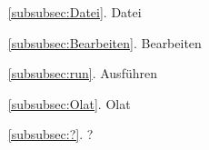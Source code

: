 \documentclass[11pt]{article}
\begin{document}
\begin{itemize}
	\item[\ref{subsubsec:Datei}.] Datei
	\item[\ref{subsubsec:Bearbeiten}.] Bearbeiten
	\item[\ref{subsubsec:run}.] Ausführen
	\item[\ref{subsubsec:Olat}.] Olat
	\item[\ref{subsubsec:?}.] ?
\end{itemize}
\end{document}
